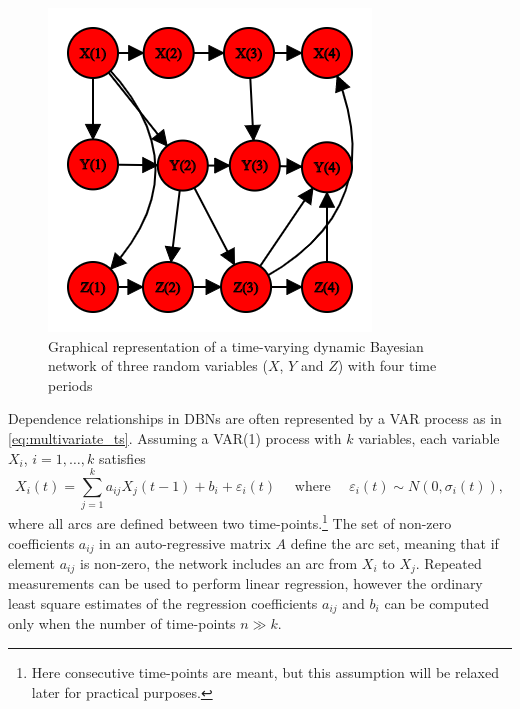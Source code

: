 \begin{figure}[H]
\centering
  \includegraphics[width=0.45\linewidth]{figures/dynamic_bn.png}
  \caption{Graphical representation of a time-varying dynamic Bayesian network of three random variables ($X$, $Y$ and $Z$) with four time periods}
  \label{fig:dynamic_bn}
\end{figure}


Dependence relationships in \acp{DBN} are often represented by a \ac{VAR} process as in \autoref{eq:multivariate_ts}. Assuming a \ac{VAR}(1) process with $k$ variables, each variable $X_i$, $i = 1,\ldots,k$ satisfies
\begin{equation}
X_{i}(t)=\sum_{j=1}^{k} a_{i j} X_{j}(t-1)+b_{i}+\varepsilon_{i}(t) \quad \text { where } \quad \varepsilon_{i}(t) \sim N\left(0, \sigma_{i}(t)\right),
\end{equation}
where all arcs are defined between two time-points.\footnote{Here consecutive time-points are meant, but this assumption will be relaxed later for practical purposes.} The set of non-zero coefficients $a_{ij}$ in an auto-regressive matrix $A$ define the arc set, meaning that if element $a_{ij}$ is non-zero, the network includes an arc from $X_i$ to $X_j$. Repeated measurements can be used to perform linear regression, however the ordinary least square estimates of the regression coefficients $a_{ij}$ and $b_i$ can be computed only when the number of time-points $n \gg k$.





